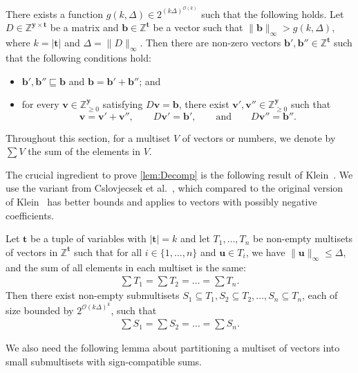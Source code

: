\documentclass{theoretics}
\renewcommand{\leq}{\leqslant}
\renewcommand{\geq}{\geqslant}
\newcommand{\cfleq}{\sqsubseteq}
\newcommand{\Z}{\mathbb{Z}}
\newcommand{\Zn}{\Z_{\geq 0}}
\newcommand{\tup}[1]{{\mathbf{#1}}}
\newcommand{\yy}{\tup y}
\newcommand{\tv}{\tup t}
\newcommand{\bb}{\tup b}
\newcommand{\uu}{\tup u}
\newcommand{\myvv}{\tup v} %
\newcommand{\matrices}[3]{#1^{#2\times #3}}
\newcommand{\Oh}{{\mathcal{O}}}
\begin{document}
\begin{lemma}\label{lem:Decomp}
There exists a function $g(k,\Delta)\in 2^{(k\Delta)^{\Oh(k)}}$ such that the following holds.
Let $D\in \matrices{\Z}{\yy}{\tv}$ be a matrix and $\bb\in \Z^{\tv}$ be a vector such that $\|\bb\|_\infty>g(k,\Delta)$,
 where $k=|\tv|$ and $\Delta=\|D\|_\infty$. Then there are non-zero vectors $\bb',\bb''\in \Z^\tv$ such that the following conditions hold:
\begin{itemize}[nosep]
    \item $\bb',\bb''\cfleq \bb$ and $\bb=\bb'+\bb''$; and
    \item for every $\myvv\in \Zn^{\yy}$ satisfying $D\myvv=\bb$, there exist $\myvv',\myvv''\in \Zn^{\yy}$ such that
    $$\myvv=\myvv'+\myvv'',\qquad D\myvv'=\bb',\qquad\textrm{and}\qquad  D\myvv''=\bb''.$$
\end{itemize}
\end{lemma}

Throughout this section, for a multiset $V$ of vectors or numbers, we denote by $\sum V$ the sum of the elements in $V$.

The crucial ingredient to prove \cref{lem:Decomp} is the following result of Klein~\cite{DBLP:journals/mp/Klein22}. We use the variant from Cslovjecsek et al.~\cite{CslovjecsekEPVW21}, which compared to the original version of Klein~\cite{DBLP:journals/mp/Klein22} has better bounds and applies to vectors with possibly negative coefficients.

\begin{lemma}[Klein Lemma, Theorem~4.1 of~\cite{CslovjecsekEPVW21} for $\epsilon=1$ and with adjusted notation]\label{lem:Klein}
Let $\tv$ be a tuple of variables with $|\tv|=k$ and let $T_1,\ldots,T_n$ be non-empty multisets of vectors in $\Z^{\tv}$ such that for all $i\in \{1,\ldots,n\}$ and $\uu\in T_i$, we have $\|\uu\|_\infty\leq \Delta$, and the sum of all elements in each multiset is the same:
\begin{align*}
    \sum T_1 =\sum T_2 = \ldots = \sum T_n.
\end{align*}
Then there exist non-empty submultisets $S_1 \subseteq T_1,S_2 \subseteq T_2,\ldots,S_n \subseteq T_n$, each of size bounded  by $2^{\Oh(k\Delta)^k}$, such that
\begin{align*}
    \sum S_1 =\sum S_2 = \ldots = \sum S_n.
\end{align*}
\end{lemma}

We also need the following lemma about partitioning a multiset of vectors into  small submultisets with sign-compatible sums.
\end{document}
